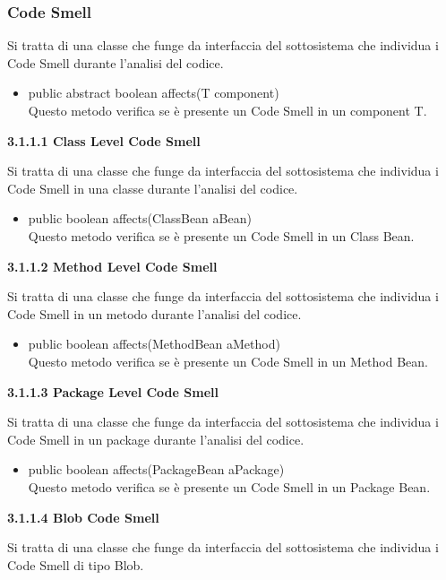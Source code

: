 \documentclass[11pt]{article}
\begin{document}
	\subsubsection{Code Smell}
	Si tratta di una classe che funge da interfaccia del sottosistema che individua i Code Smell durante l'analisi del codice.	
	\begin{itemize}
		\item  public abstract boolean affects(T component)\\
		Questo metodo verifica se è presente un Code Smell in un component T.
	\end{itemize}
	\begin{description}
		\item \textbf{ 3.1.1.1 Class Level Code Smell}
		\item Si tratta di una classe che funge da interfaccia del sottosistema che individua i Code Smell in una classe durante l'analisi del codice.		
		\begin{itemize}
			\item public boolean affects(ClassBean aBean)\\
			Questo metodo verifica se è presente un Code Smell in un Class Bean.
		\end{itemize}
		\item \textbf{ 3.1.1.2 Method Level Code Smell} 
		\item Si tratta di una classe che funge da interfaccia del sottosistema che individua i Code Smell in un metodo durante l'analisi del codice.		
		\begin{itemize}
			\item public boolean affects(MethodBean aMethod)\\
			Questo metodo verifica se è presente un Code Smell in un Method Bean.
		\end{itemize}
		\item \textbf{ 3.1.1.3 Package Level Code Smell}
		\item Si tratta di una classe che funge da interfaccia del sottosistema che individua i Code Smell in un package durante l'analisi del codice.		
		\begin{itemize}
			\item public boolean affects(PackageBean aPackage)\\
			Questo metodo verifica se è presente un Code Smell in un Package Bean.
		\end{itemize}
		\item \textbf{ 3.1.1.4 Blob Code Smell} 
		\item Si tratta di una classe che funge da interfaccia del sottosistema che individua i Code Smell di tipo Blob.		

\end{description}
\end{document}
